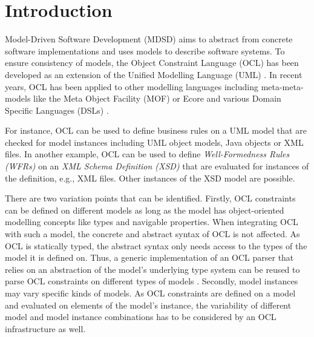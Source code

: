 \section{Introduction}

	Model-Driven Software Development (MDSD) aims to abstract from concrete 
	software implementations and uses models to describe 
	software systems. To ensure consistency of models, the Object Constraint Language 
	(OCL) \cite{spec:OCL2-2} has been developed as an extension of the Unified 
	Modelling Language (UML) \cite{spec:UML2-2}. In recent years, OCL has been 
	applied to other modelling languages including meta-meta-models 
	like the Meta Object Facility (MOF) or Ecore and various 
	Domain Specific Languages (DSLs) \cite{oclExample:DSL} . 

	For instance, OCL can be used to define business rules on a UML model 
	that are checked for model instances including UML object models,  
	Java objects or XML files. In another example, OCL can be used to define \textit{Well-Formedness 
	Rules (WFRs)} on an \textit{XML Schema Definition (XSD)} that are evaluated for instances 
	of the definition, e.g., XML files. Other instances of the XSD model are possible.
	
	There are two variation points that can be identified. Firstly, OCL constraints can 
	be defined on different models as long as the model has object-oriented 
	modelling concepts like types and navigable properties. When integrating OCL with 
	such a model, the concrete and abstract syntax of OCL is not affected. 
	As OCL is statically typed, the abstract syntax only needs access to the types of the 
	model it is defined on. Thus, a generic implementation of an OCL parser
	that relies on an abstraction of the model's underlying type system can be
	reused to parse OCL constraints on different types of models \cite{braeuerOCL07}.
	Secondly, model instances may vary specific kinds of models. As OCL constraints 
	are defined on a model and evaluated on elements of the model's instance, the variability 
	of different model and model instance combinations has to be considered by an 
	OCL infrastructure as well.
	

